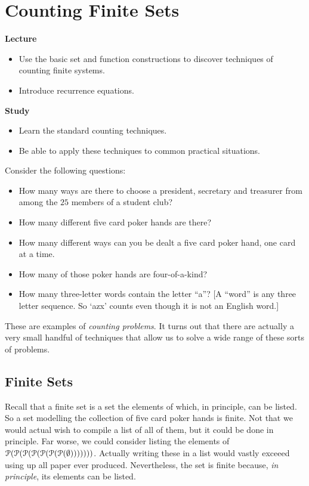 \chapter{Counting Finite Sets}

\begin{goals}
	\noindent\textbf{Lecture}
	\begin{itemize}
		\item Use the basic set and function constructions to discover techniques of counting finite systems.
		\item Introduce recurrence equations.
	\end{itemize}
	
	\noindent\textbf{Study}
	\begin{itemize}
		\item Learn the standard counting techniques.
		\item Be able to apply these techniques to common practical situations. 
	\end{itemize}
\end{goals}

Consider the following questions:
\begin{itemize}
	\item How many ways are there to choose a president, secretary and treasurer from among the $25$ members of a student club? 
	\item How many different five card poker hands are there?
	\item How many different ways can you be dealt a five card poker hand, one card at a time.
	\item How many of those poker hands are four-of-a-kind?
	\item How many three-letter words contain the letter ``a''? [A ``word'' is any three letter sequence. So `azx' counts even though it is not an English word.]
\end{itemize}

These are examples of \emph{counting problems}. It turns out that there are actually a very small handful of techniques that allow us to solve a wide range of these sorts of problems.


\section{Finite Sets}

Recall that a finite set is a set the elements of which, in principle, can be listed. 
So a set modelling the collection of five card poker hands is finite. 
Not that we would actual wish to compile a list of all of them, but it could be done in principle.
Far worse, we could consider listing the elements of ${\mathcal{P}}({\mathcal{P}}({\mathcal{P}}({\mathcal{P}}({\mathcal{P}}({\mathcal{P}}({\mathcal{P}}(\emptyset)))))))$. 
Actually writing these in a list would vastly exceeed using up all paper ever produced. 
Nevertheless, the set is finite because, \emph{in principle}, its elements can be listed.

